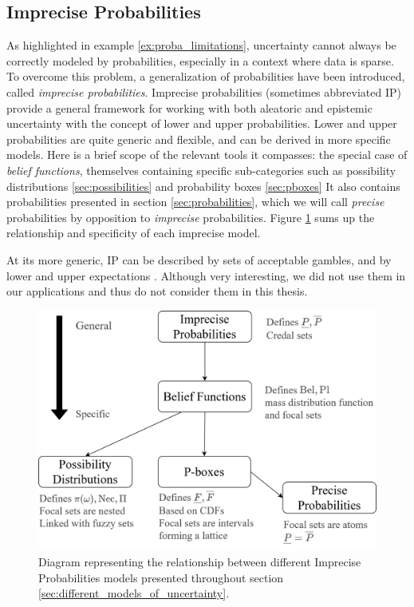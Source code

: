 \subsection{Imprecise Probabilities}\label{sec:imprecise_probabilities}
As highlighted in example \ref{ex:proba_limitations}, uncertainty cannot always be correctly modeled by probabilities, especially in a context where data is sparse. To overcome this problem, a generalization of probabilities have been introduced, called \textit{imprecise probabilities}. Imprecise probabilities (sometimes abbreviated IP) provide a general framework for working with both aleatoric and epistemic uncertainty with the concept of lower and upper probabilities. Lower and upper probabilities are quite  generic and flexible, and can be derived in more specific models. Here is a brief scope of the relevant tools it compasses: the special case of \textit{belief functions}, themselves containing specific sub-categories such as possibility distributions \ref{sec:possibilities} and probability boxes \ref{sec:pboxes} \etc It also contains probabilities presented in section \ref{sec:probabilities}, which we will call \textit{precise} probabilities by opposition to \textit{imprecise} probabilities. Figure \ref{fig:diagram_IP} sums up the relationship and specificity of each imprecise model.

\begin{remark}
    At its more generic, IP can be described by sets of acceptable gambles, and by lower and upper expectations \cite{walley_statistical_1991,augustin_introduction_2014}. Although very interesting, we did not use them in our applications and thus do not consider them in this thesis.
\end{remark}
\begin{figure}[ht]
    {\centering
    \includegraphics[width=0.8\linewidth]{Images/Diagramme_IP_Bel.png}
    \caption{Diagram representing the relationship between different Imprecise Probabilities models presented throughout section \ref{sec:different_models_of_uncertainty}.}
    \label{fig:diagram_IP}}
\end{figure}

